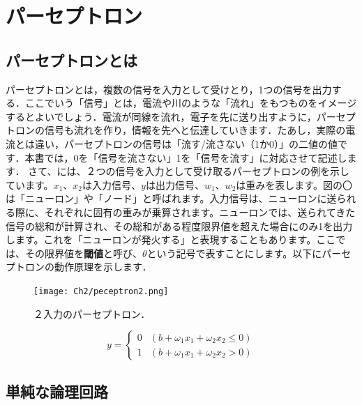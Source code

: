 \section{パーセプトロン}
\subsection{パーセプトロンとは}
パーセプトロンとは，複数の信号を入力として受けとり，1つの信号を出力する．ここでいう「信号」とは，電流や川のような「流れ」をもつものをイメージするとよいでしょう．電流が同線を流れ，電子を先に送り出すように，パーセプトロンの信号も流れを作り，情報を先へと伝達していきます．たあし，実際の電流とは違い，パーセプトロンの信号は「流す/流さない（1か0）」の二値の値です．本書では，0を「信号を流さない」1を「信号を流す」に対応させて記述します．
さて、には、２つの信号を入力として受け取るパーセプトロンの例を示しています。$x_1$、$x_2$は入力信号、$y$は出力信号、$w_1$、$w_2$は重みを表します。図の〇は「ニューロン」や「ノード」と呼ばれます。入力信号は、ニューロンに送られる際に、それぞれに固有の重みが乗算されます。ニューロンでは、送られてきた信号の総和が計算され、その総和がある程度限界値を超えた場合にのみ1を出力します。これを「ニューロンが発火する」と表現することもあります。ここでは、その限界値を\textbf{閾値}と呼び、$\theta$という記号で表すことにします。以下にパーセプトロンの動作原理を示します．

\begin{figure}[h]
  \vspace{0mm}
  \begin{center}
    \hspace{0mm}
    \centering
    \texttt{[image: Ch2/peceptron2.png]} \
    \vspace{0mm}
    \caption{２入力のパーセプトロン．}
    \label{fig:perceptron2}
  \end{center}
\end{figure}


\begin{equation}
    y = \left\{
\begin{array}{ll}
0 & (b + \omega_1 x_1 + \omega_2 x_2 \le 0)\\
1 & (b + \omega_1 x_1 + \omega_2 x_2 > 0)
\end{array}
    \right.
\end{equation}

\subsection{単純な論理回路}
